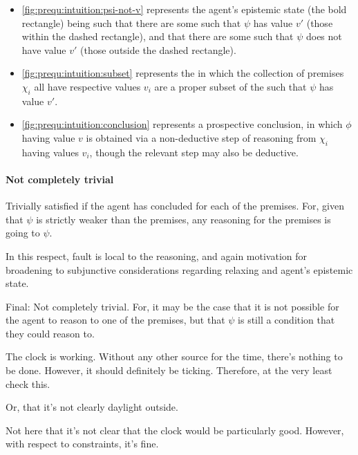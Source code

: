 \begin{note}
  \begin{itemize}
  \item
    \autoref{fig:prequ:intuition:psi-not-v} represents the agent's epistemic state (the bold rectangle) being such that there are some  such that \(\psi\) has value \(v'\) (those within the dashed rectangle), and that there are some  such that \(\psi\) does not have value \(v'\) (those outside the dashed rectangle).
  \item
    \autoref{fig:prequ:intuition:subset} represents the  in which the collection of premises \(\chi_{i}\) all have respective values \(v_{i}\) are a proper subset of the  such that \(\psi\) has value \(v'\).
  \item
    \autoref{fig:prequ:intuition:conclusion} represents a prospective conclusion, in which \(\phi\) having value \(v\) is obtained via a non-deductive step of reasoning from \(\chi_{i}\) having values \(v_{i}\), though the relevant step may also be deductive.
  \end{itemize}
\end{note}

\paragraph{}

\paragraph{Not completely trivial}

\begin{note}
  Trivially satisfied if the agent has concluded for each of the premises.
  For, given that \(\psi\) is strictly weaker than the premises, any reasoning for the premises is going to \indicateV{} \(\psi\).

  In this respect, fault is local to the reasoning, and again motivation for broadening to subjunctive considerations regarding relaxing and agent's epistemic state.

  Final: Not completely trivial.
  For, it may be the case that it is not possible for the agent to reason to one of the premises, but that \(\psi\) is still a condition that they could reason to.
\end{note}

\begin{note}
  \begin{illustration}
    The clock is working.
    Without any other source for the time, there's nothing to be done.
    However, it should definitely be ticking.
    Therefore, at the very least check this.
  \end{illustration}
  Or, that it's not clearly daylight outside.

  Not here that it's not clear that the clock would be particularly good.
  However, with respect to constraints, it's fine.
\end{note}


